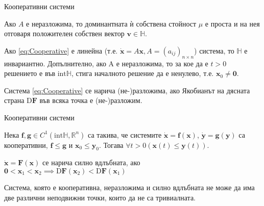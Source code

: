 \begin{frame}[t]{Кооперативни системи}
  \begin{theorem}
    Ако $A$ е неразложима, то доминантната ѝ собствена стойност $\mu$ е проста и на нея отговаря положителен собствен вектор $\mathbf{v} \in \mathbb{H}$.
  \end{theorem}

  \begin{theorem}
    Ако \ref{eq:Cooperative} е линейна (т.е. $\dot{\mathbf{x}} = A \mathbf{x}, A = (a_{ij})_{n \times n}$) система, то $\mathbb{H}$ е инвариантно. Допълнително, ако A е неразложима, то за кое да е $t > 0$ решението е във $\mathrm{int} \mathbb{H}$, стига началното решение да е ненулево, т.е. $\mathbf{x}_0 \neq \mathbf{0}$.
  \end{theorem}

  \begin{definition}
    Система \ref{eq:Cooperative} се нарича (не-)разложима, ако Якобианът на дясната страна $\mathrm{D}\mathbf{F}$ във всяка точка е (не-)разложим.
  \end{definition}
\end{frame}

\begin{frame}[t]{Кооперативни системи}
  \begin{theorem}
    \label{thm:Comparison}
    Нека $\mathbf{f}, \mathbf{g} \in C^1(\mathrm{int} \mathbb{H}, \mathbb{R}^n)$ са такива, че системите $\dot{\mathbf{x}}=\mathbf{f}(\mathbf{x})$, $\dot{\mathbf{y}}=\mathbf{g}(\mathbf{y})$ са кооперативни, $\mathbf{f} \leq \mathbf{g}$ и $\mathbf{x}_0 \leq \mathbf{y}_0$. Тогава $\forall{t>0}(\mathbf{x}(t) \leq \mathbf{y}(t))$.
  \end{theorem}

  \begin{definition}
    $\dot{\mathbf{x}} = \mathbf{F}(\mathbf{x})$ се нарича силно вдлъбната, ако $\mathbf{0} < \mathbf{x}_1 < \mathbf{x}_2 \implies \mathrm{D}\mathbf{F}(\mathbf{x}_2) < \mathrm{D}\mathbf{F}(\mathbf{x}_1)$
  \end{definition}

  \begin{theorem}
    Система, която е кооперативна, неразложима и силно вдлъбната не може да има две различни неподвижни точки, които да не са тривиалната.
  \end{theorem}
\end{frame}

